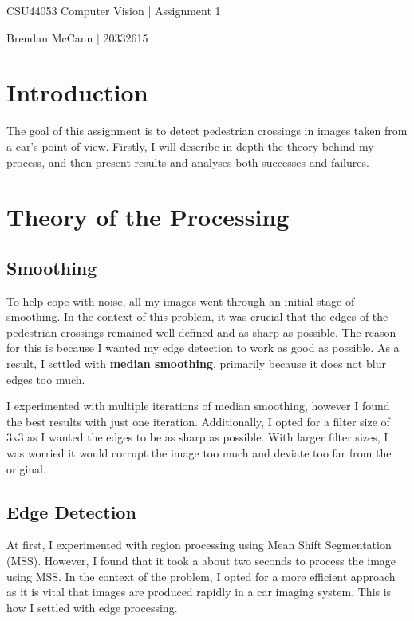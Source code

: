 \documentclass{article}  %
\begin{document}
	
	\begin{center}
		\begin{Large}
			CSU44053 Computer Vision | Assignment 1
			
			Brendan McCann | 20332615
		\end{Large}
	\end{center}
	
	\section*{Introduction}
	
	The goal of this assignment is to detect pedestrian crossings in images taken from a car's point of view. Firstly, I will describe in depth the theory behind my process, and then present results and analyses both successes and failures.
	
	\section{Theory of the Processing}
	
	\subsection{Smoothing}
	
	To help cope with noise, all my images went through an initial stage of smoothing. In the context of this problem, it was crucial that the edges of the pedestrian crossings remained well-defined and as sharp as possible. The reason for this is because I wanted my edge detection to work as good as possible. As a result, I settled with \textbf{median smoothing}, primarily because it does not blur edges too much.
	
	I experimented with multiple iterations of median smoothing, however I found the best results with just one iteration. Additionally, I opted for a filter size of 3x3 as I wanted the edges to be as sharp as possible. With larger filter sizes, I was worried it would corrupt the image too much and deviate too far from the original.
	
	\subsection{Edge Detection}
	
	At first, I experimented with region processing using Mean Shift Segmentation (MSS). However, I found that it took a about two seconds to process the image using MSS. In the context of the problem, I opted for a more efficient approach as it is vital that images are produced rapidly in a car imaging system. This is how I settled with edge processing.
	
\end{document}
